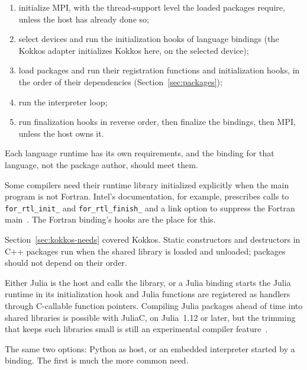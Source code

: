 \documentclass[11pt,a4paper]{article}
\newcommand{\code}[1]{\texttt{#1}}
\begin{document}
\begin{enumerate}
  \item initialize MPI, with the thread-support level the loaded packages
        require, unless the host has already done so;
  \item select devices and run the initialization hooks of language bindings
        (the Kokkos adapter initializes Kokkos here, on the selected device);
  \item load packages and run their registration functions and
        initialization hooks, in the order of their dependencies
        (Section~\ref{sec:packages});
  \item run the interpreter loop;
  \item run finalization hooks in reverse order, then finalize the bindings,
        then MPI, unless the host owns it.
\end{enumerate}

Each language runtime has its own requirements, and the binding for that
language, not the package author, should meet them.

\begin{description}[style=nextline,leftmargin=2em]
  \item[Fortran.]
        Some compilers need their runtime library initialized explicitly when
        the main program is not Fortran.  Intel's documentation, for example,
        prescribes calls to \code{for\_rtl\_init\_} and
        \code{for\_rtl\_finish\_} and a link option to suppress the Fortran
        main~\cite{intelmixed}.  The Fortran binding's hooks are the place for
        this.
  \item[C++ and Kokkos.]
        Section~\ref{sec:kokkos-needs} covered Kokkos.  Static constructors
        and destructors in C++ packages run when the shared library is loaded
        and unloaded; packages should not depend on their order.
  \item[Julia.]
        Either Julia is the host and calls the library, or a Julia binding
        starts the Julia runtime in its initialization hook and Julia
        functions are registered as handlers through C-callable function
        pointers.  Compiling Julia packages ahead of time into shared
        libraries is possible with JuliaC, on Julia~1.12 or later, but the
        trimming that keeps such libraries small is still an experimental
        compiler feature~\cite{juliac}.
  \item[Python.]
        The same two options: Python as host, or an embedded interpreter
        started by a binding.  The first is much the more common need.
\end{description}
\end{document}
